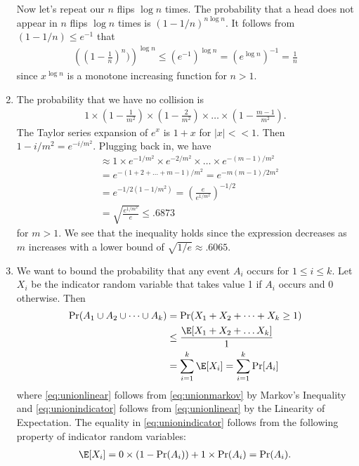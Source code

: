 \begin{enumerate}
    Now let's repeat our $n$ flips $\log n$ times.
    The probability that a head does not appear in $n$ flips $\log n$
    times is $(1-1/n)^{n \log n}$.
    It follows from $(1-1/n) \leq e^{-1}$ that
    \begin{align}
        \left((1-\frac{1}{n})^n)\right)^{\log n} \leq
        (e^{-1})^{\log n} = (e^{\log n})^{-1} = \frac{1}{n}
        \nonumber
    \end{align}
    since $x^{\log n}$ is a monotone increasing function for $n > 1$.
    \qedsymbol
    
    \item The probability that we have no collision is
    \begin{align}
        1 \times (1 - \frac{1}{m^2}) \times (1 - \frac{2}{m^2}) \times
        \dots \times (1 - \frac{m-1}{m^2}).
        \nonumber
    \end{align}
    The Taylor series expansion of $e^x$ is $1+x$ for $|x| << 1.$
    Then $1-i/m^2 = e^{-i/m^2}$.
    Plugging back in, we have
    \begin{align}
        &\approx 1 \times e^{-1/m^2} \times e^{-2/m^2} \times
        \dots \times e^{-(m-1)/m^2} \nonumber \\
        &= e^{-(1+2+\dots+m-1)/m^2} = e^{-m(m-1)/2m^2} \nonumber \\
        &= e^{-1/2 (1 - 1/m^2)} =
        \left(\frac{e}{e^{1/m^2}}\right)^{-1/2} \nonumber \\
        &= \sqrt{\frac{e^{1/m^2}}{e}} \leq .6873
        \nonumber
    \end{align}
    for $m>1$.
    We see that the inequality holds since the expression decreases
    as $m$ increases with a lower bound of $\sqrt{1/e} \approx .6065$.
    \qedsymbol
    
    \item We want to bound the probability that any event $A_i$
    occurs for $1 \leq i \leq k$.
    Let $X_i$ be the indicator random variable that takes value 1
    if $A_i$ occurs and 0 otherwise.
    Then
    \begin{align}
        \label{eq:unionmarkov}
        \Pr(A_1 \cup A_2 \cup \dots \cup A_k) &=
        \Pr(X_1 + X_2 + \dots + X_k \geq 1) \\
        \label{eq:unionlinear}
        & \leq \frac{\E[X_1+X_2 + \dots X_k]}{1}\\
        \label{eq:unionindicator}
        &= \sum_{i=1}^k \E[X_i] = \sum_{i=1}^k \Pr[A_i] 
    \end{align}
    where \autoref{eq:unionlinear} follows from
    \autoref{eq:unionmarkov} by Markov's Inequality and
    \autoref{eq:unionindicator} follows from 
    \autoref{eq:unionlinear} by the Linearity of Expectation.
    The equality in \autoref{eq:unionindicator} follows
    from the following property of indicator random variables:
    \begin{align}
        \E[X_i] = 0 \times (1-\Pr(A_i)) + 1 \times \Pr(A_i) =
        \Pr(A_i).
        \nonumber
    \end{align}
    \qedsymbol
    
\end{enumerate}
    
